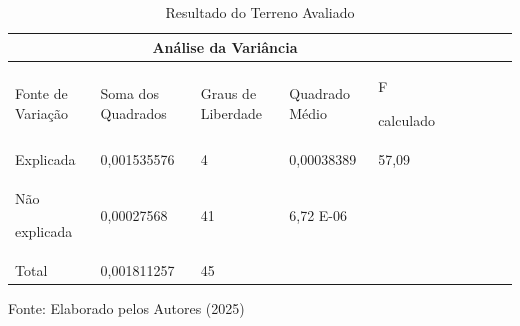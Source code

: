 \begin{table}[h!t]
	\centering
	\begin{threeparttable}
		\caption{Resultado do Terreno Avaliado }
		\label{Tabela-entrada-avaliafd5do}
		\begin{tabular}{p{3.0cm}lp{1.0cm}lp{2.0cm}lp{2.0cm}lp{1.5cm}l}
			\toprule
			\multicolumn{5}{c}{Análise da Variância} 	\\ \midrule
			Fonte de Variação &Soma  dos Quadrados &Graus de Liberdade& Quadrado Médio &F \par calculado\\  \midrule
			Explicada	&0,001535576&	4&	0,00038389&57,09	\\ 
			Não \par  explicada & 0,00027568	&41	&6,72 E-06	& 	\\ 
			Total&	0,001811257	&45	 & & & \\\bottomrule
		\end{tabular}%
		\begin{tablenotes}
			\item [{\normalsize Fonte:     Elaborado pelos Autores (2025)}]  
		\end{tablenotes}
	\end{threeparttable}
\end{table}



